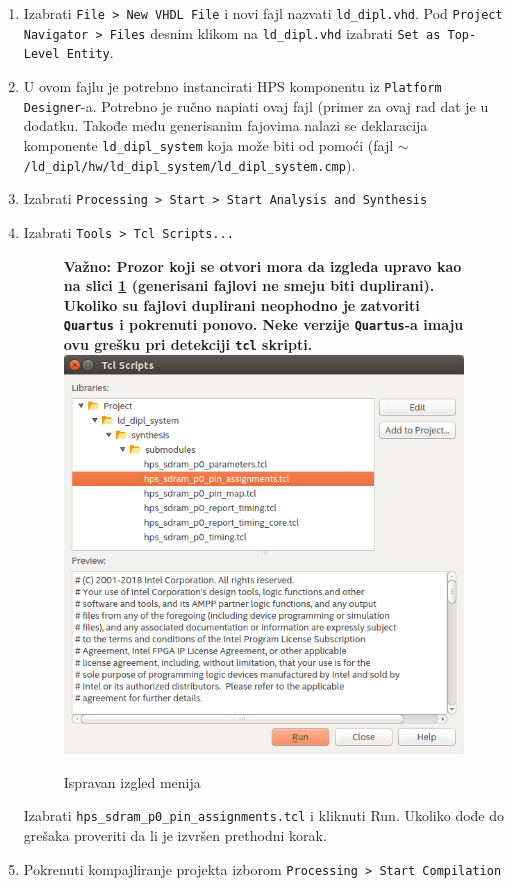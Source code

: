 \begin{enumerate}
\item  Izabrati \texttt{File > New VHDL File} i novi fajl nazvati \texttt{ld\_dipl.vhd}. Pod \texttt{Project Navigator > Files} desnim klikom na \texttt{ld\_dipl.vhd} izabrati \texttt{Set as Top-Level Entity}.
\item  U ovom fajlu je potrebno instancirati HPS komponentu iz \texttt{Platform Designer}-a. Potrebno je ručno napiati ovaj fajl (primer za ovaj rad dat je u dodatku. Takođe među generisanim fajovima nalazi se deklaracija komponente \texttt{ld\_dipl\_system} koja može biti od pomoći (fajl \texttt{$\sim$/ld\_dipl/hw/ld\_dipl\_system/ld\_dipl\_system.cmp}).
\item  Izabrati \texttt{Processing > Start > Start Analysis and Synthesis}
\item  Izabrati \texttt{Tools > Tcl Scripts...}\\
\begin{figure}[h!]
\centering
\textbf{Važno: Prozor koji se otvori mora da izgleda upravo kao na slici \ref{slika:tcl} (generisani fajlovi ne smeju biti duplirani). Ukoliko su fajlovi duplirani neophodno je zatvoriti \texttt{Quartus} i pokrenuti ponovo. Neke verzije \texttt{Quartus}-a imaju ovu grešku pri detekciji \texttt{tcl} skripti.}\\
\includegraphics[scale=0.5]{img/tcl.png}
\caption{Ispravan izgled menija}
\label{slika:tcl}
\end{figure}
 
 Izabrati \texttt{hps\_sdram\_p0\_pin\_assignments.tcl} i kliknuti Run. Ukoliko dođe do grešaka proveriti da li je izvršen prethodni korak.
\item  Pokrenuti kompajliranje projekta izborom \texttt{Processing > Start Compilation}
 

\end{enumerate}